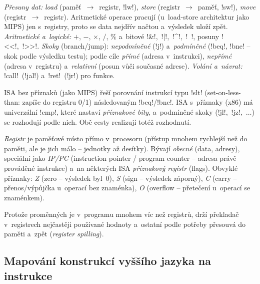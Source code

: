 \begin{definice}
\emph{Přesuny dat:} \emph{load} (paměť~$\to$~registr, \cd!lw!), \emph{store} (registr~$\to$~paměť, \cd!sw!), \emph{move} (registr~$\to$~registr). Aritmetické operace pracují (u~load-store architektur jako MIPS) jen s~registry, proto se data nejdřív načtou a~výsledek uloží zpět. \emph{Aritmetické a~logické:} $+$, $-$, $\times$, $/$, $\%$ a~bitové \cd!&!,~\cd!|!,~\cd!^!,~\cd!~!, posuny \cd!<<!,~\cd!>>!. \emph{Skoky} (branch/jump): \emph{nepodmíněné} (\cd!j!) a~\emph{podmíněné} (\cd!beq!, \cd!bne! -- skok podle výsledku testu); podle cíle \emph{přímé} (adresa v~instrukci), \emph{nepřímé} (adresa v~registru) a~\emph{relativní} (posun vůči současné adrese). \emph{Volání a~návrat:} \cd!call!~(\cd!jal!) a~\cd!ret!~(\cd!jr!) pro funkce.
\end{definice}

\begin{poznamka}
ISA bez příznaků (jako MIPS) řeší porovnání instrukcí typu \cd!slt! (set-on-less-than: zapíše do registru 0/1) následovaným \cd!beq!/\cd!bne!. ISA s~příznaky (x86) má univerzální \cd!cmp!, které nastaví \emph{příznakové bity}, a~podmíněné skoky (\cd!jl!,~\cd!jz!,~$\ldots$) se rozhodují podle nich. Obě cesty realizují totéž rozhodnutí.
\end{poznamka}

\begin{definice}
\emph{Registr} je paměťové místo přímo v~procesoru (přístup mnohem rychlejší než do paměti, ale je jich málo -- jednotky až desítky). Bývají \emph{obecné} (data, adresy), speciální jako \emph{IP/PC} (instruction pointer / program counter -- adresa právě prováděné instrukce) a~na některých ISA \emph{příznakový registr} (flags). Obvyklé příznaky: \emph{Z} (zero -- výsledek byl~0), \emph{S} (sign -- výsledek záporný), \emph{C} (carry -- přenos/výpůjčka u~operací bez znaménka), \emph{O} (overflow -- přetečení u~operací se znaménkem).
\end{definice}

Protože proměnných je v~programu mnohem víc než registrů, drží překladač v~registrech nejčastěji používané hodnoty a~ostatní podle potřeby přesouvá do paměti a~zpět (\emph{register spilling}).

\subsection{Mapování konstrukcí vyššího jazyka na instrukce}

